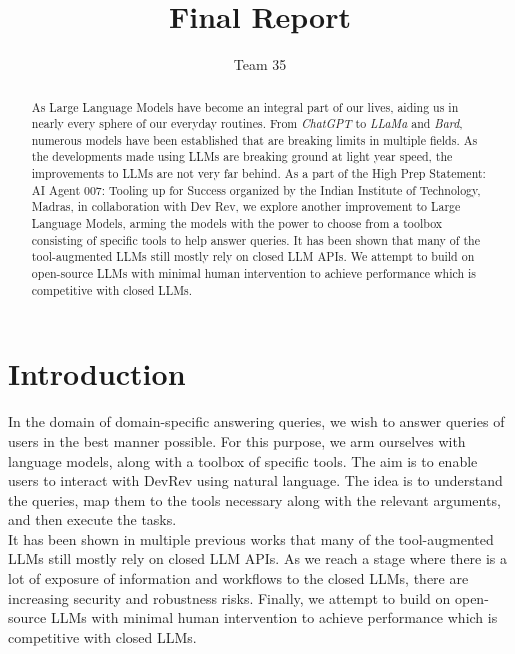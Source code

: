 \documentclass[10pt,twocolumn,letterpaper]{article}
\begin{document}
\title{%
Final Report}

\author{Team 35}
\maketitle

\begin{abstract}
As Large Language Models have become an integral part of our lives, aiding us in nearly every sphere of our everyday routines. From \textit{ChatGPT} to \textit{LLaMa} and \textit{Bard}, numerous models have been established that are breaking limits in multiple fields. As the developments made using LLMs are breaking ground at light year speed, the improvements to LLMs are not very far behind. As a part of the High Prep Statement: AI Agent 007: Tooling up for Success organized by the Indian Institute of Technology, Madras, in collaboration with Dev Rev, we explore another improvement to Large Language Models, arming the models with the power to choose from a toolbox consisting of specific tools to help answer queries. It has been shown that many of the tool-augmented LLMs still mostly rely on closed LLM APIs. We attempt to build on open-source LLMs with minimal human intervention to achieve performance which is competitive with closed LLMs.
\end{abstract}

\section{Introduction}
In the domain of domain-specific answering queries, we wish to answer queries of users in the best manner possible. For this purpose, we arm ourselves with language models, along with a toolbox of specific tools. The aim is to enable users to interact with DevRev using natural language. The idea is to understand the queries, map them to the tools necessary along with the relevant arguments, and then execute the tasks.\\
It has been shown in multiple previous works that many of the tool-augmented LLMs still mostly rely on closed LLM APIs. As we reach a stage where there is a lot of exposure of information and workflows to the closed LLMs, there are increasing security and robustness risks. Finally, we attempt to build on open-source LLMs with minimal human intervention to achieve performance which is competitive with closed LLMs.
\end{document}
